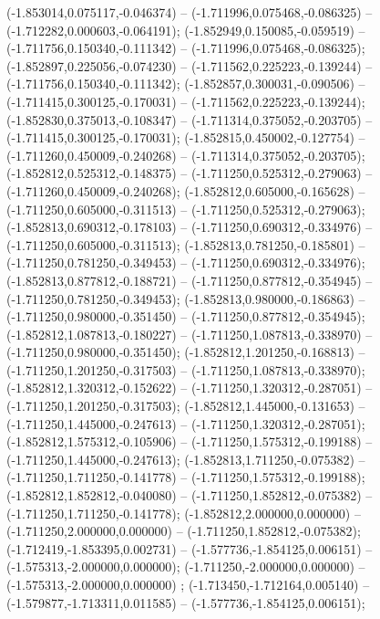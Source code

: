  (-1.853014,0.075117,-0.046374) -- (-1.711996,0.075468,-0.086325) -- (-1.712282,0.000603,-0.064191);
 (-1.852949,0.150085,-0.059519) -- (-1.711756,0.150340,-0.111342) -- (-1.711996,0.075468,-0.086325);
 (-1.852897,0.225056,-0.074230) -- (-1.711562,0.225223,-0.139244) -- (-1.711756,0.150340,-0.111342);
 (-1.852857,0.300031,-0.090506) -- (-1.711415,0.300125,-0.170031) -- (-1.711562,0.225223,-0.139244);
 (-1.852830,0.375013,-0.108347) -- (-1.711314,0.375052,-0.203705) -- (-1.711415,0.300125,-0.170031);
 (-1.852815,0.450002,-0.127754) -- (-1.711260,0.450009,-0.240268) -- (-1.711314,0.375052,-0.203705);
 (-1.852812,0.525312,-0.148375) -- (-1.711250,0.525312,-0.279063) -- (-1.711260,0.450009,-0.240268);
 (-1.852812,0.605000,-0.165628) -- (-1.711250,0.605000,-0.311513) -- (-1.711250,0.525312,-0.279063);
 (-1.852813,0.690312,-0.178103) -- (-1.711250,0.690312,-0.334976) -- (-1.711250,0.605000,-0.311513);
 (-1.852813,0.781250,-0.185801) -- (-1.711250,0.781250,-0.349453) -- (-1.711250,0.690312,-0.334976);
 (-1.852813,0.877812,-0.188721) -- (-1.711250,0.877812,-0.354945) -- (-1.711250,0.781250,-0.349453);
 (-1.852813,0.980000,-0.186863) -- (-1.711250,0.980000,-0.351450) -- (-1.711250,0.877812,-0.354945);
 (-1.852812,1.087813,-0.180227) -- (-1.711250,1.087813,-0.338970) -- (-1.711250,0.980000,-0.351450);
 (-1.852812,1.201250,-0.168813) -- (-1.711250,1.201250,-0.317503) -- (-1.711250,1.087813,-0.338970);
 (-1.852812,1.320312,-0.152622) -- (-1.711250,1.320312,-0.287051) -- (-1.711250,1.201250,-0.317503);
 (-1.852812,1.445000,-0.131653) -- (-1.711250,1.445000,-0.247613) -- (-1.711250,1.320312,-0.287051);
 (-1.852812,1.575312,-0.105906) -- (-1.711250,1.575312,-0.199188) -- (-1.711250,1.445000,-0.247613);
 (-1.852813,1.711250,-0.075382) -- (-1.711250,1.711250,-0.141778) -- (-1.711250,1.575312,-0.199188);
 (-1.852812,1.852812,-0.040080) -- (-1.711250,1.852812,-0.075382) -- (-1.711250,1.711250,-0.141778);
 (-1.852812,2.000000,0.000000) -- (-1.711250,2.000000,0.000000) -- (-1.711250,1.852812,-0.075382);
 (-1.712419,-1.853395,0.002731) -- (-1.577736,-1.854125,0.006151) -- (-1.575313,-2.000000,0.000000);
 (-1.711250,-2.000000,0.000000) -- (-1.575313,-2.000000,0.000000) ;
 (-1.713450,-1.712164,0.005140) -- (-1.579877,-1.713311,0.011585) -- (-1.577736,-1.854125,0.006151);
